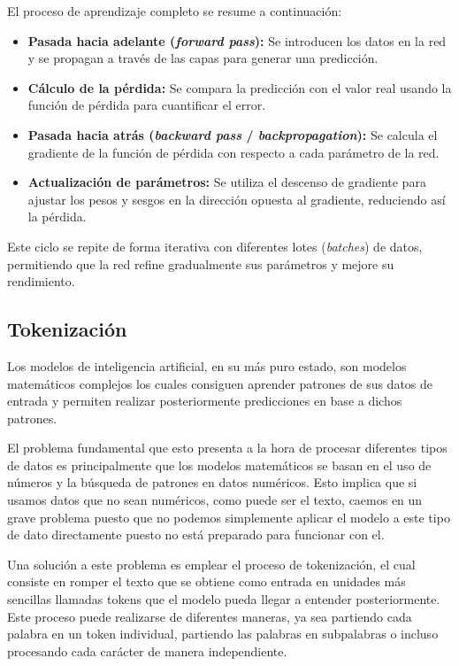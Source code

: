 El proceso de aprendizaje completo se resume a continuación:

\begin{itemize}
	\item \textbf{Pasada hacia adelante (\textit{forward pass}):} Se introducen los datos en la red y se propagan a través de las capas para generar una predicción.
	
	\item \textbf{Cálculo de la pérdida:} Se compara la predicción con el valor real usando la función de pérdida para cuantificar el error.

	\item \textbf{Pasada hacia atrás (\textit{backward pass} / \textit{backpropagation}):} Se calcula el gradiente de la función de pérdida con respecto a cada parámetro de la red.

	\item \textbf{Actualización de parámetros:} Se utiliza el descenso de gradiente para ajustar los pesos y sesgos en la dirección opuesta al gradiente, reduciendo así la pérdida.
\end{itemize}

Este ciclo se repite de forma iterativa con diferentes lotes (\textit{batches}) de datos, permitiendo que la red refine gradualmente sus parámetros y mejore su rendimiento.

\subsection{Tokenización}

Los modelos de inteligencia artificial, en su más puro estado, son modelos matemáticos complejos los cuales consiguen aprender patrones de sus datos de entrada y permiten realizar posteriormente predicciones en base a dichos patrones.

El problema fundamental que esto presenta a la hora de procesar diferentes tipos de datos es principalmente que los modelos matemáticos se basan en el uso de números y la búsqueda de patrones en datos numéricos. Esto implica que si usamos datos que no sean numéricos, como puede ser el texto, caemos en un grave problema puesto que no podemos simplemente aplicar el modelo a este tipo de dato directamente puesto no está preparado para funcionar con el.

Una solución a este problema es emplear el proceso de tokenización, el cual consiste en romper el texto que se obtiene como entrada en unidades más sencillas llamadas tokens que el modelo pueda llegar a entender posteriormente. Este proceso puede realizarse de diferentes maneras, ya sea partiendo cada palabra en un token individual, partiendo las palabras en subpalabras o incluso procesando cada carácter de manera independiente.

